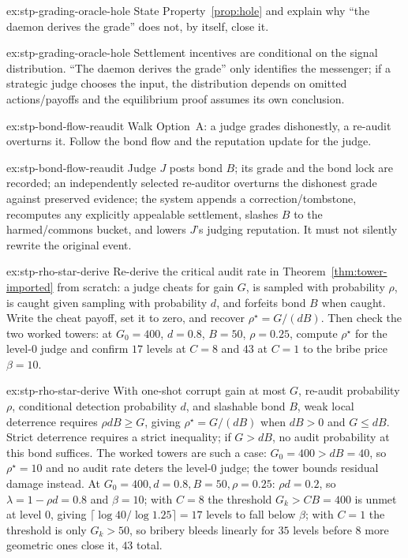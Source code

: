 \documentclass[11pt,a4paper]{article}
\theoremstyle{definition}
\begin{document}
\begin{pdexercise}[kind=Check,rating=1]{ex:stp-grading-oracle-hole}
State Property~\ref{prop:hole} and explain why ``the daemon derives the
grade'' does not, by itself, close it.
\end{pdexercise}
\begin{pdsolution}{ex:stp-grading-oracle-hole}
Settlement incentives are conditional on the signal distribution. ``The
daemon derives the grade'' only identifies the messenger; if a strategic
judge chooses the input, the distribution depends on omitted actions/payoffs
and the equilibrium proof assumes its own conclusion.
\end{pdsolution}
\begin{pdexercise}[kind=Trace,rating=2]{ex:stp-bond-flow-reaudit}
Walk Option~A: a judge grades dishonestly, a re-audit overturns it. Follow
the bond flow and the reputation update for the judge.
\end{pdexercise}
\begin{pdsolution}{ex:stp-bond-flow-reaudit}
Judge $J$ posts bond $B$; its grade and the bond lock are recorded; an
independently selected re-auditor overturns the dishonest grade against
preserved evidence; the system appends a correction/tombstone, recomputes any
explicitly appealable settlement, slashes $B$ to the harmed/commons bucket,
and lowers $J$'s judging reputation. It must not silently rewrite the
original event.
\end{pdsolution}
\begin{pdexercise}[kind=Trace,rating=2]{ex:stp-rho-star-derive}
Re-derive the critical audit rate in Theorem~\ref{thm:tower-imported} from
scratch: a judge cheats for gain $G$, is sampled with probability $\rho$, is
caught given sampling with probability $d$, and forfeits bond $B$ when
caught. Write the cheat payoff, set it to zero, and recover
$\rho^\star = G/(dB)$. Then check the two worked towers: at $G_0=400$,
$d=0.8$, $B=50$, $\rho=0.25$, compute $\rho^\star$ for the level-0 judge and
confirm $17$ levels at $C=8$ and $43$ at $C=1$ to the bribe price $\beta=10$.
\end{pdexercise}
\begin{pdsolution}{ex:stp-rho-star-derive}
With one-shot corrupt gain at most $G$, re-audit probability $\rho$,
conditional detection probability $d$, and slashable bond $B$, weak local deterrence requires $\rho d B\ge G$, giving
$\rho^\star=G/(dB)$ when $dB>0$ and $G\le dB$. Strict deterrence
requires a strict inequality; if $G>dB$, no audit probability at this bond
suffices. The worked towers are such a case: $G_0=400>dB=40$, so
$\rho^\star=10$ and no audit rate deters the level-0 judge; the tower bounds
residual damage instead. At
$G_0=400,d=0.8,B=50,\rho=0.25$: $\rho d=0.2$, so $\lambda=1-\rho d=0.8$ and
$\beta=10$; with
$C=8$ the threshold $G_k>CB=400$ is unmet at level $0$, giving
$\lceil\log 40/\log 1.25\rceil=17$ levels to fall below $\beta$; with $C=1$ the
threshold is only $G_k>50$, so bribery bleeds linearly for $35$ levels before
$8$ more geometric ones close it, $43$ total.
\end{pdsolution}
\end{document}
